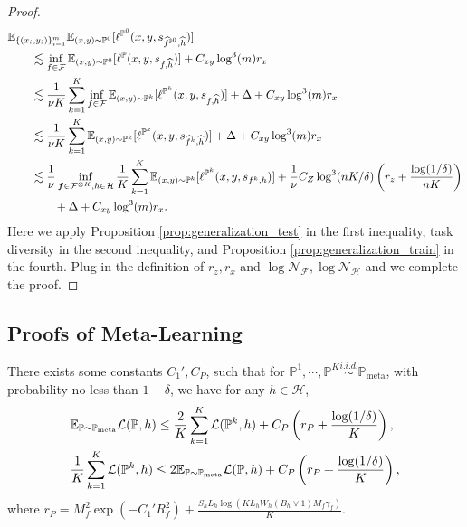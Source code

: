\documentclass[11pt]{article}
\numberwithin{equation}{section}
\newcommand{\Pmeta}{\mathbb{P}_{\text{meta}}}
\renewcommand{\P}{\mathbb{P}}
\begin{document}
\begin{proof}
    \begin{equation}
        \begin{aligned}
            &\E_{\{(x_i,y_i)\}_{i=1}^m} \E_{(x,y)\sim\P^0} [\ell^{\P^0}(x,y,s_{\widehat{f}^{\P^0},\widehat{h}})] \\
            &\qquad \lesssim \inf_{f\in\mathcal{F}} \E_{(x,y)\sim\P^0} [\ell^\P(x,y,s_{f,\widehat{h}})]+C_{xy}\log^3(m)r_x \\
            &\qquad \lesssim \frac{1}{\nu K}\sum_{k=1}^K\inf_{f\in\mathcal{F}} \E_{(x,y)\sim\P^k} [\ell^{\P^k}(x,y,s_{f,\widehat{h}})]+\Delta+C_{xy}\log^3(m)r_x \\
            &\qquad \lesssim \frac{1}{\nu K}\sum_{k=1}^K \E_{(x,y)\sim\P^k} [\ell^{\P^k}(x,y,s_{\widehat{f}^k,\widehat{h}})]+\Delta+C_{xy}\log^3(m)r_x \\
            &\qquad \lesssim \frac{1}{\nu}\inf_{\vf\in\mathcal{F}^{\otimes K},h\in\mathcal{H}} \frac{1}{K}\sum_{k=1}^K \E_{(x,y)\sim\P^k} [\ell^{\P^k}(x,y,s_{f^k,h})]+\frac{1}{\nu}C_Z\log^3(nK/\delta)\left(r_z+\frac{\log(1/\delta)}{nK}\right) \\
            &\qquad\qquad +\Delta+C_{xy}\log^3(m)r_x.
        \end{aligned}
    \end{equation}
    Here we apply Proposition \ref{prop:generalization_test} in the first inequality, task diversity in the second inequality, and Proposition \ref{prop:generalization_train} in the fourth. 
    Plug in the definition of $r_z,r_x$ and $\log\mathcal{N}_\mathcal{F},\log\mathcal{N}_\mathcal{H}$ and we complete the proof.
\end{proof}

\subsection{Proofs of Meta-Learning}\label{app:subsec:generalization}

\begin{prop}\label{prop:generalization_meta}
    There exists some constants $C_1',C_P$, such that for $\P^1,\cdots,\P^K\overset{\textit{i.i.d.}}{\sim}\Pmeta$, 
    with probability no less than $1-\delta$, we have for any $h\in\mathcal{H}$,
    \begin{align}
        &\E_{\P\sim\Pmeta}\mathcal{L}(\P,h)
        \leq \frac{2}{K}\sum_{k=1}^K\mathcal{L}(\P^k,h)+C_P\left(r_P+\frac{\log(1/\delta)}{K}\right), \\
        &\frac{1}{K}\sum_{k=1}^K\mathcal{L}(\P^k,h)\leq 2\E_{\P\sim\Pmeta}\mathcal{L}(\P,h)
        +C_P\left(r_P+\frac{\log(1/\delta)}{K}\right),
    \end{align}
    where $r_P=M_f^2\exp(-C_1'R_f^2)+\frac{S_hL_h\log\left(KL_hW_h(B_h\vee 1)M_f\gamma_f\right)}{K}$.
\end{prop}
\end{document}
